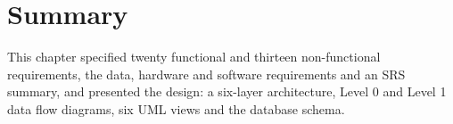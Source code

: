 \FloatBarrier
\section{Summary}\label{sec:4.7}

This chapter specified twenty functional and thirteen non-functional requirements, the data, hardware and software requirements and an SRS summary, and presented the design: a six-layer architecture, Level 0 and Level 1 data flow diagrams, six UML views and the database schema.
